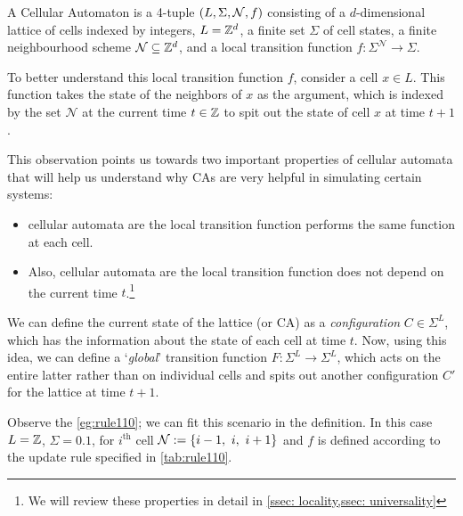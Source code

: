 \documentclass[11pt, oneside, listof=totoc]{scrbook}
\begin{document}
\begin{definition}
    A Cellular Automaton is a 4-tuple \(\qty(L, \Sigma, \mathcal{N}, f)\) consisting of a $d$-dimensional lattice of cells indexed by integers, $L = \mathbb Z^d$, a finite set $\Sigma$ of cell states, a finite neighbourhood scheme $\mathcal{N} \subseteq \mathbb Z^d$, and a local transition function $f: \Sigma^{\mathcal{N}} \to \Sigma$.
\end{definition}

To better understand this local transition function \(f\), consider a cell \(x \in L\). This function takes the state of the neighbors of \(x\) as the argument, which is indexed by the set \(\mathcal{N}\) at the current time \(t \in \mathbb Z\) to spit out the state of cell $x$ at time $t + 1$.

\noindent This observation points us towards two important properties of cellular automata that will help us understand why CAs are very helpful in simulating certain systems:

\begin{itemize}
    \item cellular automata are  \ie the local transition function performs the same function at each cell.
    \item Also, cellular automata are  \ie the local transition function does not depend on the current time $t$.\footnote{We will review these properties in detail in \cref{ssec: locality,ssec: universality}}
\end{itemize}

\noindent We can define the current state of the lattice (or CA) as a \emph{configuration} \(C \in \Sigma^{L}\), which has the information about the state of each cell at time \(t\). Now, using this idea, we can define a `\emph{global}' transition function \(F: \Sigma^{L} \to \Sigma^{L}\), which acts on the entire latter rather than on individual cells and spits out another configuration \(C'\) for the lattice at time \(t+1\).

\begin{remark}
    Observe the \cref{eg:rule110}; we can fit this scenario in the definition. In this case \(L = \mathbb Z\), \(\Sigma = \qty{0, 1}\), for $i^{\text{th}}$ cell \(\mathcal{N} := \qty{i-1,~ i,~ i+1}\) and \(f\) is defined according to the update rule specified in \cref{tab:rule110}.
\end{remark}
\end{document}

